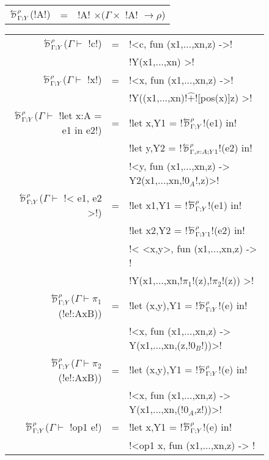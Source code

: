 \begin{figure*}[t]
    \begin{tabular}{r c l}
        $\directD{\rho}{\Gamma}{Y}$(!A!) &=&  !A! $\times (\Gamma \times$ !A! $\to \rho$)\\
    \end{tabular}
    \medskip

    \begin{tabular}{r c l}
        $\directD{\rho}{\Gamma}{Y}$($\Gamma\vdash $ !c!) &=& 
            !<c, fun (x1,...,xn,z) ->! \\
            && !Y(x1,...,xn) >!\\
        $\directD{\rho}{\Gamma}{Y}$($\Gamma\vdash $ !x!) &=& 
            !<x, fun (x1,...,xn,z) ->! \\
            && !Y((x1,...,xn)!$\widehat{+}$![pos(x)]z) >!\\
        $\directD{\rho}{\Gamma}{Y}$($\Gamma\vdash $ !let x:A = e1 in e2!) &=& 
            !let x,Y1 = !$\directD{\rho}{\Gamma}{Y}$!(e1) in! \\
            &&!let y,Y2 = !$\directD{\rho}{\Gamma,x:A}{Y1}$!(e2) in!\\ 
            &&!<y, fun (x1,...,xn,z) -> Y2(x1,...,xn,!$0_{A}$!,z)>!\\
        $\directD{\rho}{\Gamma}{Y}$($\Gamma\vdash $ !< e1, e2 >!) &=&
            !let x1,Y1 = !$\directD{\rho}{\Gamma}{Y}$!(e1) in! \\
            &&!let x2,Y2 = !$\directD{\rho}{\Gamma}{Y1}$!(e2) in!\\
            &&!< <x,y>, fun (x1,...,xn,z) -> !\\
            &&!Y(x1,...,xn,!$\pi_1$!(z),!$\pi_2$!(z)) >!\\ 
        $\directD{\rho}{\Gamma}{Y}$($\Gamma\vdash \pi_1$(!e!:AxB)) &=&
            !let (x,y),Y1 = !$\directD{\rho}{\Gamma}{Y}$!(e) in! \\
            && !<x, fun (x1,...,xn,z) -> Y(x1,...,xn,(z,!$0_B$!))>! \\
        $\directD{\rho}{\Gamma}{Y}$($\Gamma\vdash \pi_2$(!e!:AxB)) &=&
            !let (x,y),Y1 = !$\directD{\rho}{\Gamma}{Y}$!(e) in! \\
            && !<x, fun (x1,...,xn,z) -> Y(x1,...,xn,(!$0_A$,z!))>! \\
        $\directD{\rho}{\Gamma}{Y}$($\Gamma\vdash $ !op1 e!) &=&  
            !let x,Y1 = !$\directD{\rho}{\Gamma}{Y}$!(e) in! \\
            && !<op1 x, fun (x1,...,xn,z) -> ! \\

\end{tabular}
\end{figure*}
